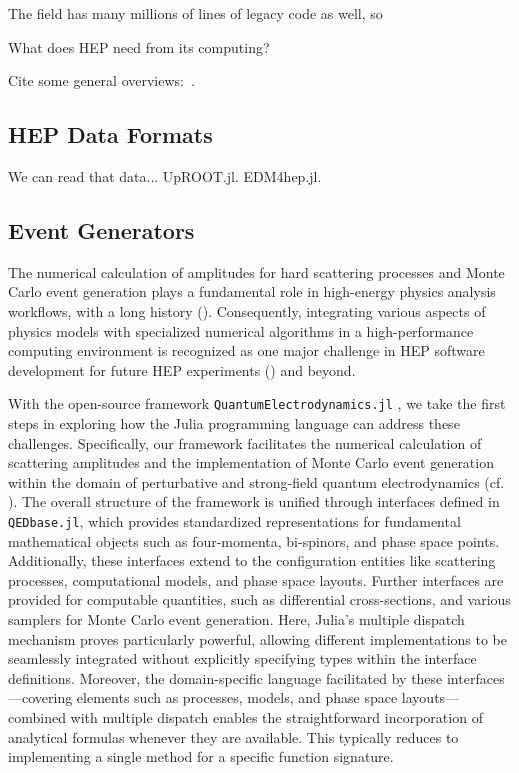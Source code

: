 \documentclass{webofc}
\begin{document}
The
field has many millions of lines of legacy code as well, so 

What does HEP need from its computing?

Cite some general overviews:~\cite{Stanitzki:2020bnx,eschle2023potential}.

\subsection{HEP Data Formats}

We can read that data... UpROOT.jl. EDM4hep.jl.

\subsection{Event Generators}

The numerical calculation of amplitudes for hard scattering processes and Monte
Carlo event generation plays a fundamental role in high-energy physics analysis
workflows, with a long history (\cite{campbell2024event}). Consequently,
integrating various aspects of physics models with specialized numerical
algorithms in a high-performance computing environment is recognized as one
major challenge in HEP software development for future HEP experiments
(\cite{HEPSoftwareFoundation:2017ggl, HSFPhysicsEventGeneratorWG:2020gxw,
HSFPhysicsEventGeneratorWG:2021xti}) and beyond.

With the open-source framework \texttt{QuantumElectrodynamics.jl}
\cite{qedjl-github}, we take the first steps in exploring how the Julia
programming language can address these challenges. Specifically, our framework
facilitates the numerical calculation of scattering amplitudes and the
implementation of Monte Carlo event generation within the domain of perturbative
and strong-field quantum electrodynamics (cf. \cite{Fedotov:2022ely}). The
overall structure of the framework is unified through interfaces defined in
\texttt{QEDbase.jl}, which provides standardized representations for fundamental
mathematical objects such as four-momenta, bi-spinors, and phase space points.
Additionally, these interfaces extend to the configuration entities like
scattering processes, computational models, and phase space layouts. Further
interfaces are provided for computable quantities, such as differential
cross-sections, and various samplers for Monte Carlo event generation. Here,
Julia’s multiple dispatch mechanism proves particularly powerful, allowing
different implementations to be seamlessly integrated without explicitly
specifying types within the interface definitions. Moreover, the domain-specific
language facilitated by these interfaces—covering elements such as processes,
models, and phase space layouts—combined with multiple dispatch enables the
straightforward incorporation of analytical formulas whenever they are
available. This typically reduces to implementing a single method for a specific
function signature.
\end{document}

